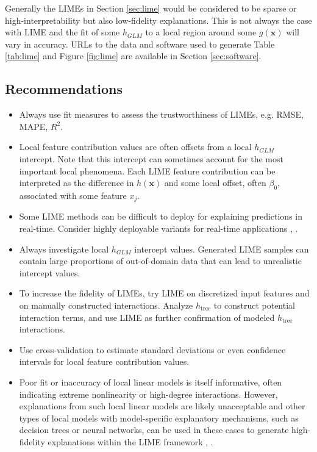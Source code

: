 \documentclass[sigconf]{acmart}
\begin{document}
Generally the LIMEs in Section \ref{sec:lime} would be considered to be sparse or high-interpretability but also low-fidelity explanations. This is not always the case with LIME and the fit of some $h_{GLM}$ to a local region around some $g(\mathbf{x})$ will vary in accuracy. URLs to the data and software used to generate Table \ref{tab:lime} and Figure \ref{fig:lime} are available in Section \ref{sec:software}.

\subsection{Recommendations}

\begin{itemize}
	
	\item Always use fit measures to assess the trustworthiness of LIMEs, e.g. RMSE, MAPE, $R^2$.

	\item Local feature contribution values are often offsets from a local $h_{GLM}$ intercept. Note that this intercept can sometimes account for the most important local phenomena. Each LIME feature contribution can be interpreted as the difference in $h(\mathbf{x})$ and some local offset, often $\beta_0$, associated with some feature $x_j$.

	\item Some LIME methods can be difficult to deploy for explaining predictions in real-time. Consider highly deployable variants for real-time applications \cite{h2o_mli_booklet}, \cite{lime-sup}.
		
	\item Always investigate local $h_{GLM}$ intercept values. Generated LIME samples can contain large proportions of out-of-domain data that can lead to unrealistic intercept values. 
		
	\item To increase the fidelity of LIMEs, try LIME on discretized input features and on manually constructed interactions. Analyze $h_{\text{tree}}$ to construct potential interaction terms, and use LIME as further confirmation of modeled $h_{\text{tree}}$ interactions.
 	
	\item Use cross-validation to estimate standard deviations or even confidence intervals for local feature contribution values.
	
	\item Poor fit or inaccuracy of local linear models is itself informative, often indicating extreme nonlinearity or high-degree interactions. However, explanations from such local linear models are likely unacceptable and other types of local models with model-specific explanatory mechanisms, such as decision trees or neural networks, can be used in these cases to generate high-fidelity explanations within the LIME framework \cite{lime}, \cite{wf_xnn}.
	
\end{itemize}
\end{document}
